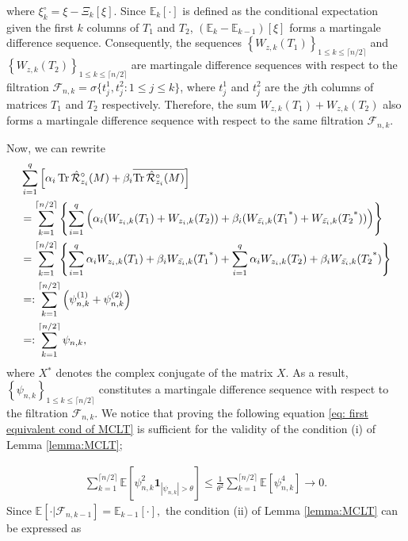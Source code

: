 \documentclass[12pt]{amsart}
\theoremstyle{plain}
\theoremstyle{definition}
\newcommand{\conjugate}{{\operatorname{^*}}}
\newcommand{\Tr}{\operatorname{Tr}}
\begin{document}
where $\xi_k^{\circ} = \xi-\Xi_{k}[\xi].$ Since $\mathbb{E}_{k}[\cdot]$ is defined as the conditional expectation given the first $k$ columns of $T_1$ and $T_2$, $(\mathbb{E}_k - \mathbb{E}_{k-1})[\xi]$ forms a martingale difference sequence. Consequently, the sequences $\left\{W_{z, k}(T_1)\right\}_{1 \leq k \leq \lceil n/2 \rceil}$ and $\left\{W_{z, k}(T_2)\right\}_{1 \leq k \leq \lceil n/2 \rceil}$ are martingale difference sequences with respect to the filtration $\mathcal{F}_{n, k} = \sigma\{t^{1}_{j}, t^{2}_{j} : 1 \leq j \leq k\}$, where $t^{1}_{j}$ and $t^{2}_{j}$ are the $j$th columns of matrices $T_{1}$ and $T_{2}$ respectively. Therefore, the sum $W_{z, k}(T_1)+W_{z, k}(T_2)$ also forms a martingale difference sequence with respect to the same filtration $\mathcal{F}_{n, k}.$

   
Now, we can rewrite
 \begin{align}
       &\sum_{i=1}^q\left[\alpha_i \Tr  \hat{\mathcal{R}}_{z_i}^{\circ}(M)+\beta_i \overline{\Tr  \hat{\mathcal{R}}_{z_i}^{\circ}(M)}\right]\notag\\
       &=\sum_{k=1}^{\lceil n/2\rceil} \left\{\sum_{i=1}^{q}\left(\alpha_{i} (W_{z_{i},k}(T_1)+W_{z_{i},k}(T_2))+ \beta_i (W_{\bar{z_{i}},k}(T_{1}\conjugate)+W_{\bar{z_{i}},k}(T_{2}\conjugate))\right)\right\}\notag\\
       &= \sum_{k=1}^{\lceil n/2\rceil} \left\{\sum_{i=1}^{q}\alpha_{i} W_{z_{i},k}(T_1)+ \beta_i W_{\bar{z_{i}},k}(T_{1}\conjugate) +\sum_{i=1}^{q}\alpha_{i} W_{z_{i},k}(T_2)+ \beta_i W_{\bar{z_{i}},k}(T_{2}\conjugate)\right\} \notag\\
       &=: \sum_{k=1}^{\lceil n/2\rceil} \left(\psi_{n,k}^{(1)}+\psi_{n,k}^{(2)}\right)\notag\\
       &=:\sum_{k=1}^{\lceil n/2\rceil} \psi_{n,k}\notag,
\end{align}
where $X\conjugate$ denotes the complex conjugate of the matrix $X$. 
As a result, $\left\{\psi_{n, k}\right\}_{1 \leq k \leq {\lceil n/2 \rceil}}$ constitutes a martingale difference sequence with respect to the filtration $\mathcal{F}_{n, k}$. We notice that proving the following equation \eqref{eq: first equivalent cond of MCLT} is sufficient for the validity of the condition (i) of Lemma \ref{lemma:MCLT};
  

\begin{align}
    \sum_{k=1}^{\lceil n/2 \rceil} \mathbb{E}\left[\psi_{n, k}^2 \mathbf{1}_{\left|\psi_{n, k}\right|>\theta}\right] \leq \frac{1}{ \theta^2} \sum_{k=1}^{\lceil n/2 \rceil} \mathbb{E}\left[\psi_{n, k}^4\right]  \rightarrow 0 \label{eq: first equivalent cond of MCLT}.
\end{align}
Since $\mathbb{E}[\cdot|\mathcal{F}_{n,k-1}]= \mathbb{E}_{k-1}[\cdot],$ the condition (ii) of Lemma \ref{lemma:MCLT} can be expressed as
\end{document}

